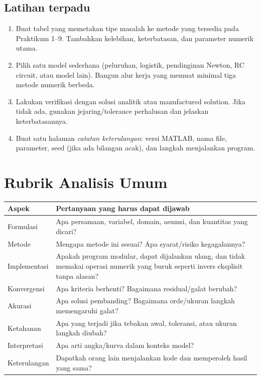 \documentclass[book,english,noindex,lean,nobackpage,nocopyright,noupdate,nofiglist,notablist]{enacom}
\begin{document}
\section{Latihan terpadu}
\begin{enumerate}
\item Buat tabel yang memetakan tipe masalah ke metode yang tersedia pada Praktikum 1--9. Tambahkan kelebihan, keterbatasan, dan parameter numerik utama.
\item Pilih satu model sederhana (peluruhan, logistik, pendinginan Newton, RC circuit, atau model lain). Bangun alur kerja yang memuat minimal tiga metode numerik berbeda.
\item Lakukan verifikasi dengan solusi analitik atau manufactured solution. Jika tidak ada, gunakan jejaring/tolerance perhalusan dan jelaskan keterbatasannya.
\item Buat satu halaman \textit{catatan keterulangan}: versi MATLAB, nama file, parameter, seed (jika ada bilangan acak), dan langkah menjalankan program.
\end{enumerate}

\chapter*{Rubrik Analisis Umum}
\begin{tabularx}{\textwidth}{p{} X}
\hline
\textbf{Aspek} & \textbf{Pertanyaan yang harus dapat dijawab}\\\hline
Formulasi & Apa persamaan, variabel, domain, asumsi, dan kuantitas yang dicari?\\
Metode & Mengapa metode ini sesuai? Apa syarat/risiko kegagalannya?\\
Implementasi & Apakah program modular, dapat dijalankan ulang, dan tidak memakai operasi numerik yang buruk seperti invers eksplisit tanpa alasan?\\
Konvergensi & Apa kriteria berhenti? Bagaimana residual/galat berubah?\\
Akurasi & Apa solusi pembanding? Bagaimana orde/ukuran langkah memengaruhi galat?\\
Ketahanan & Apa yang terjadi jika tebakan awal, toleransi, atau ukuran langkah diubah?\\
Interpretasi & Apa arti angka/kurva dalam konteks model?\\
Keterulangan & Dapatkah orang lain menjalankan kode dan memperoleh hasil yang sama?\\\hline
\end{tabularx}
\end{document}

